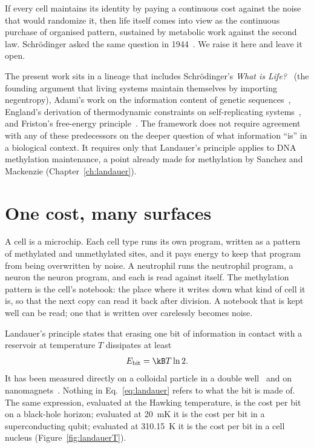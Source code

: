 If every cell maintains its identity by paying a continuous cost against the noise that would randomize it, then life itself comes into view
as the continuous purchase of organised pattern, sustained by metabolic work against the second law. Schr\"odinger asked the same question in
1944~\cite{SchrodingerWhatIsLife}. We raise it here and leave it open. \interp

The present work sits in a lineage that includes Schr\"odinger's \emph{What is Life?}~\cite{SchrodingerWhatIsLife} (the
founding argument that living systems maintain themselves by importing negentropy), Adami's work on the information content
of genetic sequences~\cite{Adami2002}, England's derivation of thermodynamic constraints on self-replicating
systems~\cite{England2013}, and Friston's free-energy principle~\cite{Friston2010}. The framework does not require agreement
with any of these predecessors on the deeper question of what information ``is'' in a biological context. It requires only
that Landauer's principle applies to DNA methylation maintenance, a point already made for methylation by Sanchez and
Mackenzie (Chapter~\ref{ch:landauer}). \interp

\section{One cost, many surfaces}

A cell is a microchip. Each cell type runs its own program, written as a pattern of methylated and unmethylated sites, and it pays energy
to keep that program from being overwritten by noise. A neutrophil runs the neutrophil program, a neuron the neuron program, and each is read
against itself. The methylation pattern is the cell's notebook: the place where it writes down what kind of cell it is, so that the next copy
can read it back after division. A notebook that is kept well can be read; one that is written over carelessly becomes noise. \analogy


Landauer's principle states that erasing one bit of information in contact with a reservoir at
temperature $T$ dissipates at least~\cite{Landauer1961,Bennett1982}
\begin{equation}
  E_{\mathrm{bit}}=\kB T\ln 2 .
  \label{eq:landauer}
\end{equation}
It has been measured directly on a colloidal particle in a double well~\cite{Berut2012} and on
nanomagnets~\cite{Hong2016}. \observed{} Nothing in Eq.~\eqref{eq:landauer} refers to what the bit is made of.
The same expression, evaluated at the Hawking temperature, is the cost per bit on a black-hole
horizon; evaluated at 20~mK it is the cost per bit in a superconducting qubit; evaluated at
310.15~K it is the cost per bit in a cell nucleus (Figure~\ref{fig:landauerT}).

